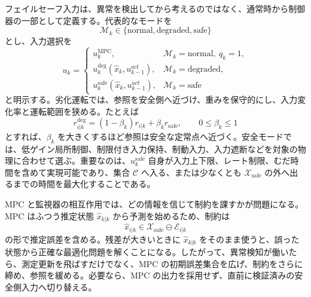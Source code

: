 フェイルセーフ入力は、異常を検出してから考えるのではなく、通常時から制御器の一部として定義する。代表的なモードを
\begin{equation}
  \mathcal{M}_k\in
  \{\mathrm{normal},\mathrm{degraded},\mathrm{safe}\}
\end{equation}
とし、入力選択を
\begin{equation}
  u_k=
  \begin{cases}
    u_k^{\mathrm{MPC}}, & \mathcal{M}_k=\mathrm{normal},\ q_k=1,\\
    u_k^{\mathrm{deg}}(\hat{x}_k,u_{k-1}^{act}), & \mathcal{M}_k=\mathrm{degraded},\\
    u_k^{\mathrm{safe}}(\hat{x}_k,u_{k-1}^{act}), & \mathcal{M}_k=\mathrm{safe}
  \end{cases}
\end{equation}
と明示する。劣化運転では、参照を安全側へ近づけ、重みを保守的にし、入力変化率と運転範囲を狭める。たとえば
\begin{equation}
  r_{i|k}^{\mathrm{deg}}
  =
  (1-\beta_k)r_{i|k}
  +\beta_k r_{\mathrm{safe}},
  \qquad
  0\le\beta_k\le1
\end{equation}
とすれば、$\beta_k$ を大きくするほど参照は安全な定常点へ近づく。安全モードでは、低ゲイン局所制御、制限付き入力保持、制動入力、入力遮断などを対象の物理に合わせて選ぶ。重要なのは、$u_k^{\mathrm{safe}}$ 自身が入力上下限、レート制限、むだ時間を含めて実現可能であり、集合 $\mathcal{C}$ へ入る、または少なくとも $\mathcal{X}_{\mathrm{safe}}$ の外へ出るまでの時間を最大化することである。

MPC と監視器の相互作用では、どの情報を信じて制約を課すかが問題になる。MPC はふつう推定状態 $\hat{x}_{k|k}$ から予測を始めるため、制約は
\begin{equation}
  \hat{x}_{i|k}\in\mathcal{X}_{\mathrm{safe}}\ominus\mathcal{E}_{i|k}
\end{equation}
の形で推定誤差を含める。残差が大きいときに $\hat{x}_{k|k}$ をそのまま使うと、誤った状態から正確な最適化問題を解くことになる。したがって、異常検知が働いたら、測定更新を飛ばすだけでなく、MPC の初期誤差集合を広げ、制約をさらに締め、参照を緩める。必要なら、MPC の出力を採用せず、直前に検証済みの安全側入力へ切り替える。

